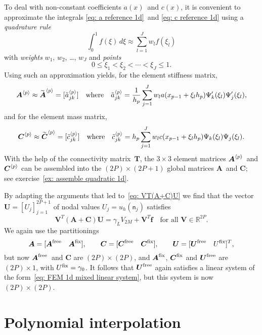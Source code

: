 To deal with non-constant coefficients $a(x)$~and $c(x)$, it is convenient to 
approximate the integrals \eqref{eq: a reference 1d}~and
\eqref{eq: c reference 1d} using a \emph{quadrature rule}
\[
\int_0^1 f(\xi)\,d\xi\approx\sum_{l=1}^J w_lf(\xi_l)
\]
with \emph{weights} $w_1$, $w_2$, \dots, $w_J$ and \emph{points}
\[
0\le\xi_1<\xi_2<\cdots<\xi_J\le1.
\]
Using such an approximation yields, for the element stiffness matrix,
\[
\boldsymbol{A}^{\langle p\rangle}\approx
	\widetilde{\boldsymbol{A}}^{\langle p\rangle}=[\tilde a_{jk}^{\langle p\rangle}]
\quad\text{where}\quad
\tilde a^{\langle p\rangle}_{jk}=\frac{1}{h_p}\sum_{j=1}^Jw_la(x_{p-1}+\xi_lh_p)
	\Psi'_k(\xi_l)\Psi'_j(\xi_l),
\]
and for the element mass matrix,
\[
\boldsymbol{C}^{\langle p\rangle}\approx
	\widetilde{\boldsymbol{C}}^{\langle p\rangle}=[\tilde c_{jk}^{\langle p\rangle}]
\quad\text{where}\quad
\tilde c^{\langle p\rangle}_{jk}=h_p\sum_{j=1}^Jw_lc(x_{p-1}+\xi_lh_p)
	\Psi_k(\xi_l)\Psi_j(\xi_l).
\]
With the help of the connectivity matrix~$\boldsymbol{T}$, the $3\times3$ 
element matrices $\boldsymbol{A}^{\langle p\rangle}$~and $\boldsymbol{C}^{\langle p\rangle}$ can be 
assembled into the $(2P)\times(2P+1)$ global matrices $\boldsymbol{A}$~and 
$\boldsymbol{C}$; see exercise~\ref{ex: assemble quadratic 1d}.

By adapting the arguments that led to~\eqref{eq: VT(A+C)U} we find that the 
vector~$\boldsymbol{U}=[U_j]_{j=1}^{2P+1}$ of nodal values 
$U_j=u_h(\mathsf{n}_j)$ satisfies
\[
\boldsymbol{V}^T(\boldsymbol{A}+\boldsymbol{C})\boldsymbol{U}
	=\gamma_LV_{2M}+\boldsymbol{V}^T\boldsymbol{f}
	\quad\text{for all $\boldsymbol{V}\in\mathbb{R}^{2P}$.}
\]
We again use the partitionings
\[
\boldsymbol{A}=[\boldsymbol{A}^{\mathrm{free}}\quad\boldsymbol{A}^{\mathrm{fix}}],\qquad
\boldsymbol{C}=[\boldsymbol{C}^{\mathrm{free}}\quad\boldsymbol{C}^{\mathrm{fix}}],\qquad
\boldsymbol{U}=[\boldsymbol{U}^{\mathrm{free}}\quad U^{\mathrm{fix}}]^T,
\]
but now $\boldsymbol{A}^{\mathrm{free}}$~and $\boldsymbol{C}$ are $(2P)\times(2P)$, and
$\boldsymbol{A}^{\mathrm{fix}}$, $\boldsymbol{C}^{\mathrm{fix}}$ and $\boldsymbol{U}^{\mathrm{free}}$ are 
$(2P)\times1$, with $U^{\mathrm{fix}}=\gamma_0$.  It follows that $\boldsymbol{U}^{\mathrm{free}}$ 
again satisfies a linear system of the 
form~\eqref{eq: FEM 1d mixed linear system}, but this system is now 
$(2P)\times(2P)$.

\section{Polynomial interpolation}

